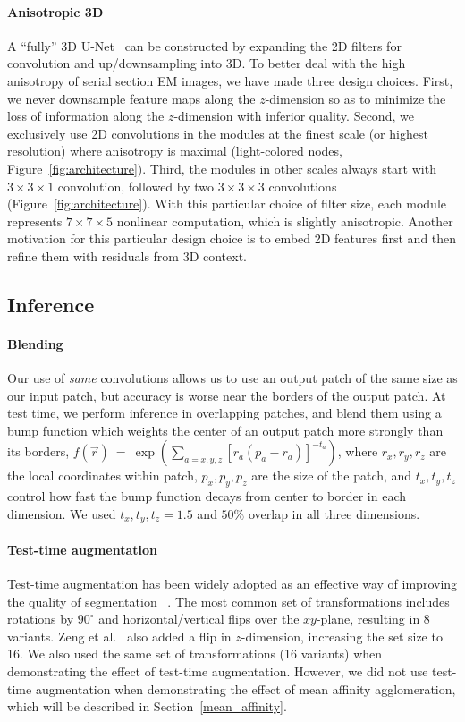 \documentclass{article}
\begin{document}
\paragraph{Anisotropic 3D} A ``fully'' 3D U-Net~\cite{cicek2016} can be
constructed by expanding the 2D filters for convolution and up/downsampling into
3D. To better deal with the high anisotropy of serial section EM images, we have
made three design choices. First, we never downsample feature maps along the
$z$-dimension so as to minimize the loss of information along the $z$-dimension
with inferior quality. Second, we exclusively use 2D convolutions in the modules
at the finest scale (or highest resolution) where anisotropy is maximal
(light-colored nodes, Figure~\ref{fig:architecture}). Third, the modules in
other scales always start with $3\times3\times1$ convolution, followed by two
$3\times3\times3$ convolutions (Figure~\ref{fig:architecture}). With this
particular choice of filter size, each module represents $7\times7\times5$
nonlinear computation, which is slightly anisotropic. Another motivation for
this particular design choice is to embed 2D features first and then refine them
with residuals from 3D context.

\subsection{Inference}
\label{inference}

\paragraph{Blending} Our use of \textit{same} convolutions allows us to use an
output patch of the same size as our input patch, but accuracy is worse near the
borders of the output patch. At test time, we perform inference in overlapping
patches, and blend them using a bump function which weights the center of an
output patch more strongly than its borders, $f(\vec{r})~=~\exp
\left(\sum_{a=x,y,z} \left[r_a(p_a-r_a)\right]^{-t_a}\right)$, where
$r_x,r_y,r_z$ are the local coordinates within patch, $p_x,p_y,p_z$ are the size
of the patch, and $t_x,t_y,t_z$ control how fast the bump function decays from
center to border in each dimension. We used $t_x, t_y, t_z=1.5$ and $50\%$
overlap in all three dimensions.

\paragraph{Test-time augmentation} Test-time augmentation has been widely
adopted as an effective way of improving the quality of segmentation
~\cite{zeng2017,ronneberger2015,beier2017,quan2016}. The most common set of
transformations includes rotations by $90^\circ$ and horizontal/vertical flips
over the $xy$-plane, resulting in 8 variants. Zeng et al.~\cite{zeng2017} also
added a flip in $z$-dimension, increasing the set size to 16. We also used the
same set of transformations (16 variants) when demonstrating the effect of
test-time augmentation. However, we did not use test-time augmentation when
demonstrating the effect of mean affinity agglomeration, which will be described
in Section~\ref{mean_affinity}.
\end{document}
